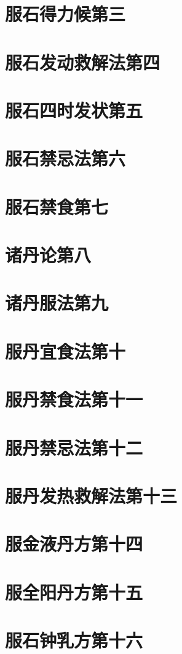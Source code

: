 \documentclass[a4paper,12pt,UTF8,twoside]{ctexbook}
\begin{document}
\chapter{服石得力候第三}
\chapter{服石发动救解法第四}
\chapter{服石四时发状第五}
\chapter{服石禁忌法第六}
\chapter{服石禁食第七}
\chapter{诸丹论第八}
\chapter{诸丹服法第九}
\chapter{服丹宜食法第十}
\chapter{服丹禁食法第十一}
\chapter{服丹禁忌法第十二}
\chapter{服丹发热救解法第十三}
\chapter{服金液丹方第十四}
\chapter{服全阳丹方第十五}
\chapter{服石钟乳方第十六}
\end{document}
